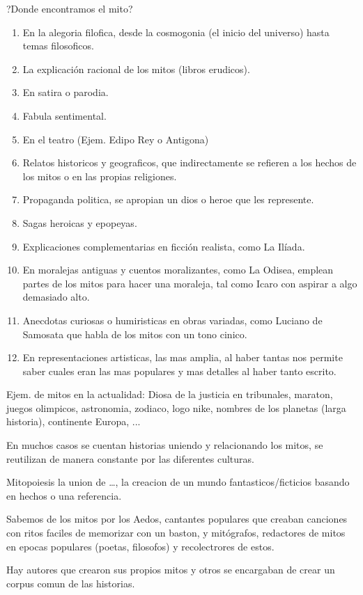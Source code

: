 \documentclass[12pt, twoside, openright]{report} %
\begin{document}
?Donde encontramos el mito?
\begin{enumerate}
  \item En la alegoria filofica, desde la cosmogonia (el inicio del universo) hasta temas filosoficos.
  \item La explicación racional de los mitos (libros erudicos).
  \item En satira o parodia.
  \item Fabula sentimental.
  \item En el teatro (Ejem. Edipo Rey o Antigona)
  \item Relatos historicos y geograficos, que indirectamente se refieren a los hechos de los mitos o en las propias religiones.
  \item Propaganda politica, se apropian un dios o heroe que les represente.
  \item Sagas heroicas y epopeyas.
  \item Explicaciones complementarias en ficción realista, como La Ilíada.
  \item En moralejas antiguas y cuentos moralizantes, como La Odisea, emplean partes de los mitos para hacer una moraleja, tal como Icaro con aspirar a algo demasiado alto.
  \item Anecdotas curiosas o humiristicas en obras variadas, como Luciano de Samosata que habla de los mitos con un tono cinico.
  \item En representaciones artisticas, las mas amplia, al haber tantas nos permite saber cuales eran las mas populares y mas detalles al haber tanto escrito.
\end{enumerate}

Ejem. de mitos en la actualidad: Diosa de la justicia en tribunales, maraton, juegos olimpicos, astronomia, zodiaco, logo nike, nombres de los planetas (larga historia), continente Europa, ...

En muchos casos se cuentan historias uniendo y relacionando los mitos, se reutilizan de manera constante por las diferentes culturas.

Mitopoiesis la union de \dots, la creacion de un mundo fantasticos/ficticios basando en hechos o una referencia.

Sabemos de los mitos por los Aedos, cantantes populares que creaban canciones con ritos faciles de memorizar con un baston, y mitógrafos, redactores de mitos en epocas populares (poetas, filosofos) y recolectrores de estos.

Hay autores que crearon sus propios mitos y otros se encargaban de crear un corpus comun de las historias.
\end{document}
